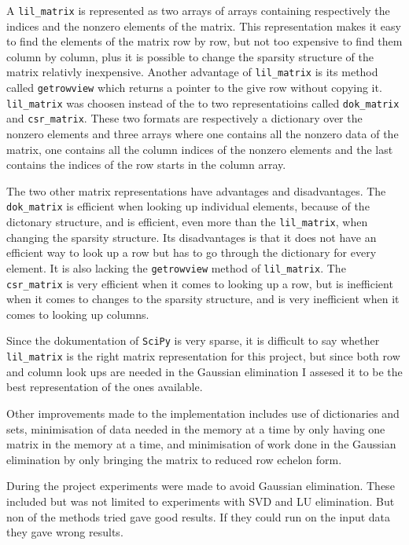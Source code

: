 \documentclass[11pt,a4paper,twoside, openright]{report}
\begin{document}
A \texttt{lil\_matrix} is represented as two arrays of arrays containing respectively the indices and the nonzero elements of the matrix. This representation makes it easy to find the elements of the matrix row by row, but not too expensive to find them column by column, plus it is possible to change the sparsity structure of the matrix relativly inexpensive\cite{csr}. Another advantage of \texttt{lil\_matrix} is its method called \texttt{getrowview} which returns a pointer to the give row without copying it. \texttt{lil\_matrix} was choosen instead of the to two representatioins called \texttt{dok\_matrix} and \texttt{csr\_matrix}. These two formats are respectively a dictionary over the nonzero elements\cite{wikiSparse} and three arrays where one contains all the nonzero data of the matrix, one contains all the column indices of the nonzero elements and the last contains the indices of the row starts in the column array\cite{karlrupp}.

The two other matrix representations have advantages and disadvantages. The \texttt{dok\_matrix} is efficient when looking up individual elements, because of the dictonary structure, and is efficient, even more than the \texttt{lil\_matrix}, when changing the sparsity structure. Its disadvantages is that it does not have an efficient way to look up a row but has to go through the dictionary for every element. It is also lacking the \texttt{getrowview} method of \texttt{lil\_matrix}\cite{dok}. The \texttt{csr\_matrix} is very efficient when it comes to looking up a row, but is inefficient when it comes to changes to the sparsity structure, and is very inefficient when it comes to looking up columns\cite{csr}.

Since the dokumentation of \texttt{SciPy} is very sparse, it is difficult to say whether \texttt{lil\_matrix} is the right matrix representation for this project, but since both row and column look ups are needed in the Gaussian elimination I assesed it to be the best representation of the ones available.

Other improvements made to the implementation includes use of dictionaries and sets, minimisation of data needed in the memory at a time by only having one matrix in the memory at a time, and minimisation of work done in the Gaussian elimination by only bringing the matrix to reduced row echelon form.

During the project experiments were made to avoid Gaussian elimination. These included but was not limited to experiments with SVD and LU elimination. But non of the methods tried gave good results. If they could run on the input data they gave wrong results.
\end{document}
